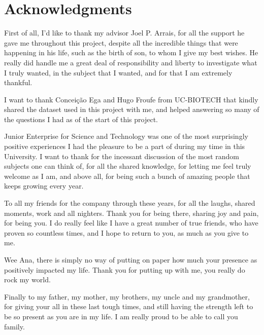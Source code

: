 
\chapter*{Acknowledgments}

First of all, I'd like to thank my advisor Joel P. Arrais, for all the support he gave me throughout this project, despite all the incredible things that were happening in his life, such as the birth of son, to whom I give my best wishes. He really did handle me a great deal of responsibility and liberty to investigate what I truly wanted, in the subject that I wanted, and for that I am extremely thankful.

I want to thank Conceição Ega and Hugo Froufe from UC-BIOTECH that kindly shared the dataset used in this project with me, and helped answering so many of the questions I had as of the start of this project.

Junior Enterprise for Science and Technology was one of the most surprisingly positive experiences I had the pleasure to be a part of during my time in this University. I want to thank for the incessant discussion of the most random subjects one can think of, for all the shared knowledge, for letting me feel truly welcome as I am, and above all, for being such a bunch of amazing people that keeps growing every year.

To all my friends for the company through these years, for all the laughs, shared moments, work and all nighters. Thank you for being there, sharing joy and pain, for being you. I do really feel like I have a great number of true friends, who have proven so countless times, and I hope to return to you, as much as you give to me.

Wee Ana, there is simply no way of putting on paper how much your presence as positively impacted my life. Thank you for putting up with me, you really do rock my world.

Finally to my father, my mother, my brothers, my uncle and my grandmother, for giving your all in these last tough times, and still having the strength left to be so present as you are in my life. I am really proud to be able to call you family.